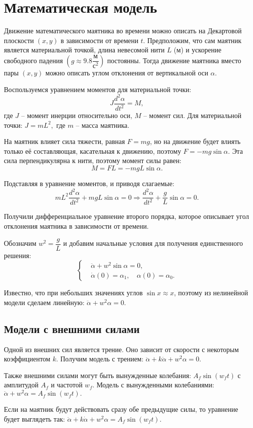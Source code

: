 \section{Математическая модель}
    Движение математического маятника во времени можно описать на Декартовой плоскости $ (x, y) $ в зависимости от времени \( t \). Предположим, что сам маятник является материальной точкой, длина невесомой нити \( L \) (м) и ускорение свободного падения \(\left( g \approx 9.8 \dfrac{\text{м}}{\text{с}^2} \right) \) постоянны. Тогда движение маятника вместо пары \((x, y) \) можно описать углом отклонения от вертикальной оси \( \alpha \).

    Воспользуемся уравнением моментов для материальной точки:
    \[
        J \dfrac{d^2 \alpha}{dt^2} = M,
    \]
    где $ J $ -- момент инерции относительно оси, $ M $ -- момент сил. Для материальной точки: \( J = mL^2, \) где $ m $ -- масса маятника. 

    На маятник влияет сила тяжести, равная \( F = mg \), но на движение будет влиять только её составляющая, касательная к движению, поэтому \( F = -mg \sin \alpha \). Эта сила перпендикулярна к нити, поэтому момент силы равен:
    \[
        M = FL = - mgL \sin \alpha.
    \]

    Подставляя в уравнение моментов, и приводя слагаемые:
    \[
        mL^2 \dfrac{d^2 \alpha}{dt^2} + mgL \sin \alpha = 0 \Rightarrow \dfrac{d^2 \alpha}{dt^2} + \dfrac{g}{L} \sin \alpha = 0.
    \]

    Получили дифференциальное уравнение второго порядка, которое описывает угол отклонения маятника в зависимости от времени.
    
    Обозначим \( w^2 = \dfrac{g}{L} \) и добавим начальные условия для получения единственного решения:
    \[
        \begin{cases}
            & \ddot{\alpha} + w^2 \sin \alpha = 0, \\
            & \dot{\alpha}(0) = \alpha_1, \quad \alpha(0) = \alpha_0.
        \end{cases}
    \]
    
    Известно, что при небольших значениях углов \( \sin x \approx x \), поэтому из нелинейной модели сделаем линейную: \( \ddot{\alpha} + w^2 \alpha = 0. \)

    \subsection{Модели с внешними силами}
        Одной из внешних сил является трение. Оно зависит от скорости с некоторым коэффициентом $ k $. Получим модель с трением: \( \ddot{\alpha} + k \dot{\alpha} + w^2 \alpha = 0. \)

        Также внешними силами могут быть вынужденные колебания: \( A_f \sin \left( w_f t \right) \) с амплитудой \( A_f \) и частотой \( w_f \). Модель с вынужденными колебаниями:\\ \( \ddot{\alpha} + w^2 \alpha = A_f \sin \left( w_f t \right). \)

        Если на маятник будут действовать сразу обе предыдущие силы, то уравнение будет выглядеть так: \( \ddot{\alpha}  + k \dot{\alpha} + w^2 \alpha = A_f \sin \left( w_f t \right). \)